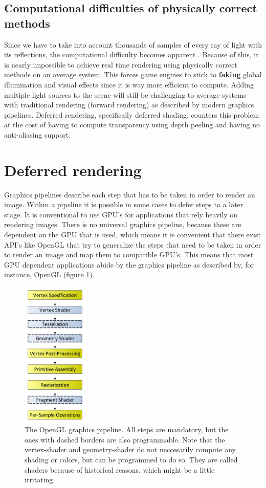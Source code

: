 \documentclass{ACGSeminar}
\begin{document}
	\subsection{Computational difficulties of physically correct methods}
	Since we have to take into account thousands of samples of every ray of light with its reflections, the computational difficulty becomes apparent \cite{DST}. Because of this, it is nearly impossible to achieve real time rendering using physically correct methods on an average system. This forces game engines to stick to \textbf{faking} global illumination and visual effects since it is way more efficient to compute. Adding multiple light sources to the scene will still be challenging to average systems with traditional rendering (forward rendering) as described by modern graphics pipelines. Deferred rendering, specifically deferred shading, counters this problem at the cost of having to compute transparency using depth peeling and having no anti-aliasing support.

\section{Deferred rendering}
	Graphics pipelines describe each step that has to be taken in order to render an image. Within a pipeline it is possible in some cases to defer steps to a later stage. It is conventional to use GPU's for applications that rely heavily on rendering images. There is no universal graphics pipeline, because these are dependent on the GPU that is used, which means it is convenient that there exist API's like OpenGL that try to generalize the steps that need to be taken in order to render an image and map them to compatible GPU's. This means that most GPU dependent applications abide by the graphics pipeline as described by, for instance, OpenGL (figure \ref{fig:graphics_pipeline}).
	\begin{figure}[htb!]%
	\begin{center}%
		\includegraphics[height=7cm]{img/graphics_pipeline.png}
	\end{center}%
	\caption{The OpenGL graphics pipeline. All steps are mandatory, but the ones with dashed borders are also programmable. Note that the vertex-shader and geometry-shader do not neccesarily compute any shading or colors, but can be programmed to do so. They are called shaders because of historical reasons, which might be a little irritating.}%
	\label{fig:graphics_pipeline}%
	\end{figure}%
\end{document}
